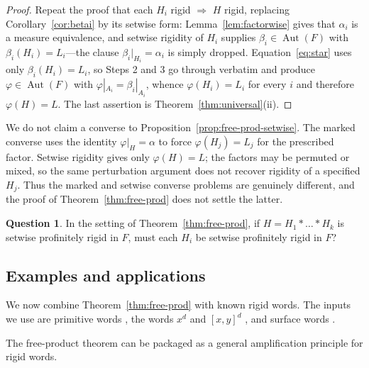 \documentclass[11pt]{amsart}
\theoremstyle{plain}
\theoremstyle{definition}
\newtheorem{question}[theorem]{Question}
\newcommand{\Aut}{\operatorname{Aut}}
\begin{document}
\begin{proof}
Repeat the proof that each $H_i$ rigid $\Rightarrow$ $H$ rigid, replacing
Corollary~\ref{cor:betai} by its setwise form: Lemma~\ref{lem:factorwise} gives
that $\alpha_i$ is a measure equivalence, and setwise rigidity of $H_i$ supplies
$\beta_i\in\Aut(F)$ with $\beta_i(H_i)=L_i$---the clause
$\beta_i|_{H_i}=\alpha_i$ is simply dropped.  Equation~\eqref{eq:star} uses only
$\beta_i(H_i)=L_i$, so Steps 2 and 3 go through verbatim and produce
$\varphi\in\Aut(F)$ with $\varphi|_{A_i}=\beta_i|_{A_i}$, whence
$\varphi(H_i)=L_i$ for every $i$ and therefore $\varphi(H)=L$.  The last
assertion is Theorem~\ref{thm:universal}(ii).
\end{proof}


We do not claim a converse to Proposition~\ref{prop:free-prod-setwise}.  The
marked converse uses the identity $\varphi|_H=\alpha$ to force
$\varphi(H_j)=L_j$ for the prescribed factor.  Setwise rigidity gives only
$\varphi(H)=L$; the factors may be permuted or mixed, so the same perturbation
argument does not recover rigidity of a specified $H_j$.  Thus the marked and
setwise converse problems are genuinely different, and the proof of
Theorem~\ref{thm:free-prod} does not settle the latter.


\begin{question}\label{q:setwise-freeprod-converse}
In the setting of Theorem~\ref{thm:free-prod}, if
$H=H_1*\dots*H_k$ is setwise profinitely rigid in $F$, must each $H_i$ be
setwise profinitely rigid in $F$?
\end{question}


\subsection{Examples and applications}\label{sec:new-families}

We now combine Theorem~\ref{thm:free-prod} with known rigid words.  The inputs
we use are primitive words \cite{PP,Wilton,GJ}, the words $x^d$ and
$[x,y]^d$ \cite{HMP}, and surface words \cite{Wilton2}. 

The free-product theorem can be packaged as a general amplification
principle for rigid words.
\end{document}
